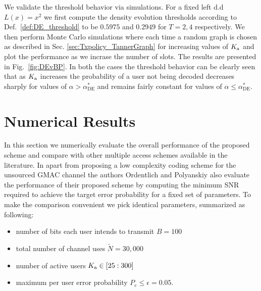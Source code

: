 We validate the threshold behavior via simulations.  For a fixed left d.d $L(x)=x^2$ we first compute the density evolution thresholds according to Def.~\ref{def:DE_threshold} to be $0.5975$ and $0.2949$ for $T=2,4$ respectively. We then perform Monte Carlo simulations where each time a random graph is chosen as described in Sec. \ref{sec:Txpolicy_TannerGraph} for increasing values of $K_{\text{a}}$ and plot the performance as we incrase the number of slots. The results are presented in Fig.~\ref{fig:DEvBP}. In both the cases the threshold behavior can be clearly seen that as $K_{\text{a}}$ increases the probability of a user not being decoded decreases sharply for values of $\alpha>\alpha_{\text{DE}}^*$ and remains fairly constant for values of $\alpha\leq\alpha_{\text{DE}}^*$.

\section{Numerical Results}
In this section we numerically evaluate the overall performance of the proposed scheme and compare with other multiple access schemes available in the literature. In \cite{ordentlich2017low} apart from proposing a low complexity coding scheme for the unsourced GMAC channel the authors Ordentlich and Polyanskiy also evaluate the performance of their proposed scheme by computing the minimum SNR required to achieve the target error probability for a fixed set of parameters. To make the comparison convenient we pick identical parameters, summarized as following:
\begin{itemize}
\item number of bits each user intends to transmit $B=100$
\item total number of channel uses $\tilde{N}=30,000$
\item number of active users $K_{\text{a}}\in [25:300]$
\item maximum per user error probability $P_e\leq \epsilon=0.05$.
\end{itemize}

